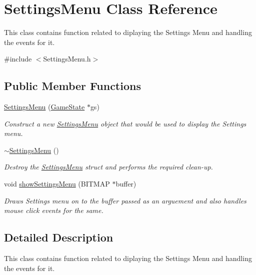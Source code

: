 \hypertarget{class_settings_menu}{}\section{Settings\+Menu Class Reference}
\label{class_settings_menu}


This class contains function related to diplaying the Settings Menu and handling the events for it.  




{\ttfamily \#include $<$Settings\+Menu.\+h$>$}

\subsection*{Public Member Functions}
\begin{DoxyCompactItemize}
\item 
\mbox{\hyperlink{class_settings_menu_a562e5ba69dd8158e08e3287adaa8468e}{Settings\+Menu}} (\mbox{\hyperlink{struct_game_state}{Game\+State}} $\ast$gs)
\begin{DoxyCompactList}\small\item\em Construct a new \mbox{\hyperlink{class_settings_menu}{Settings\+Menu}} object that would be used to display the Settings menu. \end{DoxyCompactList}\item 
\mbox{\hyperlink{class_settings_menu_ac2abb1dcd62821fdd7cdcdfa28d634c3}{$\sim$\+Settings\+Menu}} ()
\begin{DoxyCompactList}\small\item\em Destroy the \mbox{\hyperlink{class_settings_menu}{Settings\+Menu}} struct and performs the required clean-\/up. \end{DoxyCompactList}\item 
void \mbox{\hyperlink{class_settings_menu_a5df9575a1e6e76b4159b417e4f66b222}{show\+Settings\+Menu}} (B\+I\+T\+M\+AP $\ast$buffer)
\begin{DoxyCompactList}\small\item\em Draws Settings menu on to the buffer passed as an arguement and also handles mouse click events for the same. \end{DoxyCompactList}\end{DoxyCompactItemize}


\subsection{Detailed Description}
This class contains function related to diplaying the Settings Menu and handling the events for it. 



